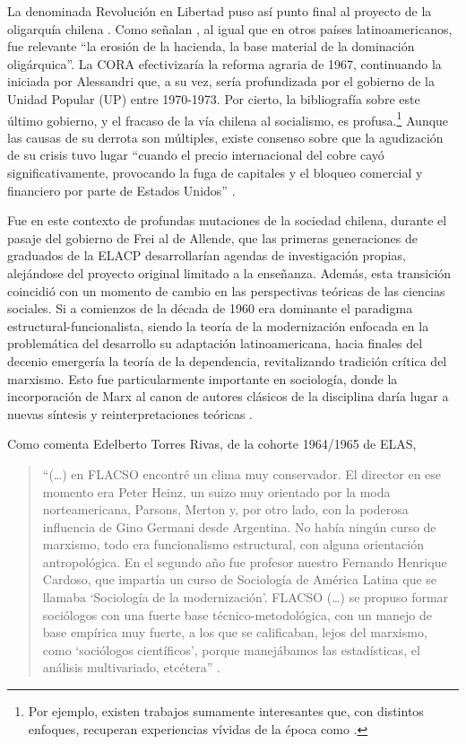 La denominada Revolución en Libertad puso así punto final al proyecto de la oligarquía chilena \parencite{1694-LECHNER2004}. Como señalan \textcite[613-614]{1518-ANSALDI2012}, al igual que en otros países latinoamericanos, fue relevante \enquote{la erosión de la hacienda, la base material de la dominación oligárquica}. La CORA efectivizaría la reforma agraria de 1967, continuando la iniciada por Alessandri que, a su vez, sería profundizada por el gobierno de la Unidad Popular (UP) entre 1970-1973. Por cierto, la bibliografía sobre este último gobierno, y el fracaso de la vía chilena al socialismo, es profusa.\footnote{Por ejemplo, existen trabajos sumamente interesantes que, con distintos enfoques, recuperan experiencias vívidas de la época como \textcite{1503-TOURAINE1974,1630-GARCES2013}.} Aunque las causas de su derrota son múltiples, existe consenso sobre que la agudización de su crisis tuvo lugar \enquote{cuando el precio internacional del cobre cayó significativamente, provocando la fuga de capitales y el bloqueo comercial y financiero por parte de Estados Unidos} \parencite[408]{1519-ANSALDI2012}.

Fue en este contexto de profundas mutaciones de la sociedad chilena, durante el pasaje del gobierno de Frei al de Allende, que las primeras generaciones de graduados de la ELACP desarrollarían agendas de investigación propias, alejándose del proyecto original limitado a la enseñanza. Además, esta transición coincidió con un momento de cambio en las perspectivas teóricas de las ciencias sociales. Si a comienzos de la década de 1960 era dominante el paradigma estructural-funcionalista, siendo la teoría de la modernización enfocada en la problemática del desarrollo su adaptación latinoamericana, hacia finales del decenio emergería la teoría de la dependencia, revitalizando tradición crítica del marxismo. Esto fue particularmente importante en sociología, donde la incorporación de Marx al canon de autores clásicos de la disciplina daría lugar a nuevas síntesis y reinterpretaciones teóricas \parencite{1516-ALEXANDER2008}.

Como comenta Edelberto Torres Rivas, de la cohorte 1964/1965 de ELAS,

\begin{quote}
\enquote{(\dots) en FLACSO encontré un clima muy conservador. El director en ese momento era Peter Heinz, un suizo muy orientado por la moda norteamericana, Parsons, Merton y, por otro lado, con la poderosa influencia de Gino Germani desde Argentina. No había ningún curso de marxismo, todo era funcionalismo estructural, con alguna orientación antropológica. En el segundo año fue profesor nuestro Fernando Henrique Cardoso, que impartía un curso de Sociología de América Latina que se llamaba \enquote{Sociología de la modernización}. FLACSO (\dots) se propuso formar sociólogos con una fuerte base técnico-metodológica, con un manejo de base empírica muy fuerte, a los que se calificaban, lejos del marxismo, como \enquote{sociólogos científicos}, porque manejábamos las estadísticas, el análisis multivariado, etcétera} \parencite[111]{1520-BATAILLON2006}.
\end{quote}

